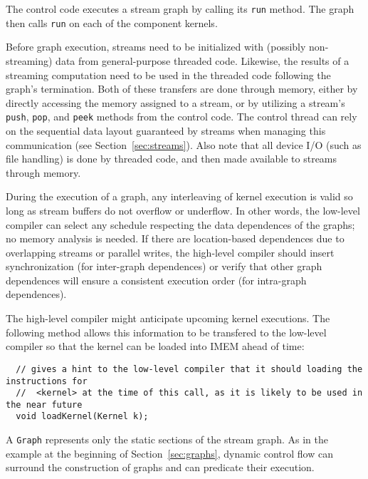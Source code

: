 
The control code executes a stream graph by calling its {\tt run}
method.  The graph then calls {\tt run} on each of the component
kernels.  

Before graph execution, streams need to be initialized with (possibly
non-streaming) data from general-purpose threaded code.  Likewise, the
results of a streaming computation need to be used in the threaded
code following the graph's termination.  Both of these transfers are
done through memory, either by directly accessing the memory assigned
to a stream, or by utilizing a stream's {\tt push}, {\tt pop}, and
{\tt peek} methods from the control code.  The control thread can rely
on the sequential data layout guaranteed by streams when managing this
communication (see Section~\ref{sec:streams}).  Also note that all
device I/O (such as file handling) is done by threaded code, and then
made available to streams through memory.

During the execution of a graph, any interleaving of kernel execution
is valid so long as stream buffers do not overflow or underflow.  In
other words, the low-level compiler can select any schedule respecting
the data dependences of the graphs; no memory analysis is needed.  If
there are location-based dependences due to overlapping streams or
parallel writes, the high-level compiler should insert synchronization
(for inter-graph dependences) or verify that other graph dependences
will ensure a consistent execution order (for intra-graph
dependences).

The high-level compiler might anticipate upcoming kernel executions.
The following method allows this information to be transfered to the
low-level compiler so that the kernel can be loaded into IMEM ahead of
time:
\begin{verbatim}
  // gives a hint to the low-level compiler that it should loading the instructions for
  //  <kernel> at the time of this call, as it is likely to be used in the near future
  void loadKernel(Kernel k);
\end{verbatim}


A {\tt Graph} represents only the static sections of the stream graph.
As in the example at the beginning of Section~\ref{sec:graphs},
dynamic control flow can surround the construction of graphs and can
predicate their execution.

